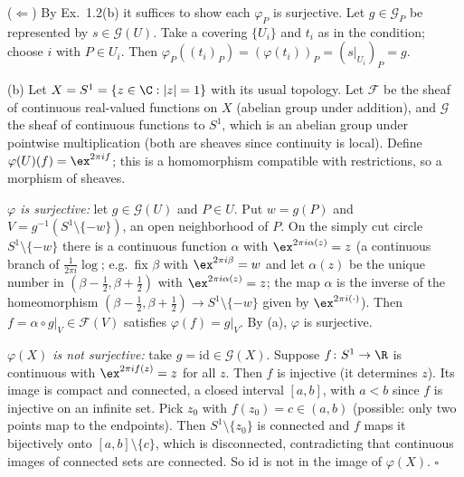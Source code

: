 \documentclass[11pt]{article}
\begin{document}
($\Leftarrow$) By Ex.~1.2(b) it suffices to show each $\varphi_P$ is surjective. Let $g\in\mathcal G_P$ be represented by $s\in\mathcal G(U)$. Take a covering $\{U_i\}$ and $t_i$ as in the condition; choose $i$ with $P\in U_i$. Then $\varphi_P((t_i)_P)=(\varphi(t_i))_P=(s|_{U_i})_P=g$.

(b) Let $X=S^1=\{z\in\C:|z|=1\}$ with its usual topology. Let $\mathcal F$ be the sheaf of continuous real-valued functions on $X$ (abelian group under addition), and $\mathcal G$ the sheaf of continuous functions to $S^1$, which is an abelian group under pointwise multiplication (both are sheaves since continuity is local). Define $\varphi(U)(f)=\ex^{2\pi i f}$; this is a homomorphism compatible with restrictions, so a morphism of sheaves.

\emph{$\varphi$ is surjective:} let $g\in\mathcal G(U)$ and $P\in U$. Put $w=g(P)$ and $V=g^{-1}(S^1\setminus\{-w\})$, an open neighborhood of $P$. On the simply cut circle $S^1\setminus\{-w\}$ there is a continuous function $\alpha$ with $\ex^{2\pi i\alpha(z)}=z$ (a continuous branch of $\frac1{2\pi i}\log$; e.g.\ fix $\beta$ with $\ex^{2\pi i\beta}=w$ and let $\alpha(z)$ be the unique number in $(\beta-\tfrac12,\beta+\tfrac12)$ with $\ex^{2\pi i\alpha(z)}=z$; the map $\alpha$ is the inverse of the homeomorphism $(\beta-\tfrac12,\beta+\tfrac12)\to S^1\setminus\{-w\}$ given by $\ex^{2\pi i(\cdot)}$). Then $f=\alpha\circ g|_V\in\mathcal F(V)$ satisfies $\varphi(f)=g|_V$. By (a), $\varphi$ is surjective.

\emph{$\varphi(X)$ is not surjective:} take $g=\mathrm{id}\in\mathcal G(X)$. Suppose $f\colon S^1\to\R$ is continuous with $\ex^{2\pi if(z)}=z$ for all $z$. Then $f$ is injective (it determines $z$). Its image is compact and connected, a closed interval $[a,b]$, with $a<b$ since $f$ is injective on an infinite set. Pick $z_0$ with $f(z_0)=c\in(a,b)$ (possible: only two points map to the endpoints). Then $S^1\setminus\{z_0\}$ is connected and $f$ maps it bijectively onto $[a,b]\setminus\{c\}$, which is disconnected, contradicting that continuous images of connected sets are connected. So $\mathrm{id}$ is not in the image of $\varphi(X)$. \hfill$\square$
\end{document}
